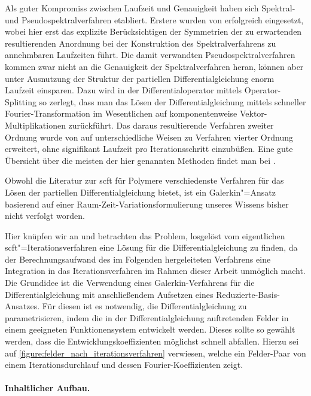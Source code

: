 \documentclass[../main.tex]{subfiles}
\begin{document}
Als guter Kompromiss zwischen Laufzeit und Genauigkeit haben sich Spektral- und Pseudospektralverfahren etabliert.
Erstere wurden von \textcite{Matsen:1994bz} erfolgreich eingesetzt, wobei hier erst das explizite Berücksichtigen der Symmetrien der zu erwartenden resultierenden Anordnung bei der Konstruktion des Spektralverfahrens zu annehmbaren Laufzeiten führt.
Die damit verwandten Pseudospektralverfahren kommen zwar nicht an die Genauigkeit der Spektralverfahren heran, können aber unter Ausnutzung der Struktur der partiellen Differentialgleichung enorm Laufzeit einsparen.
Dazu wird in \cite{Rasmussen:2002kt} der Differentialoperator mittels Operator-Splitting so zerlegt, dass man das Lösen der Differentialgleichung mittels schneller Fourier-Transformation im Wesentlichen auf komponentenweise Vektor-Multiplikationen zurückführt.
Das daraus resultierende Verfahren zweiter Ordnung wurde von \cite{GarciaCervera:2006uu,Ranjan:2007kl} auf unterschiedliche Weisen zu Verfahren vierter Ordnung erweitert, ohne signifikant Laufzeit pro Iterationsschritt einzubüßen.
Eine gute Übersicht über die meisten der hier genannten Methoden findet man bei \textcites[Section 3.6]{Fredrickson:2006th}{Audus:2013ep}.

Obwohl die Literatur zur \ac{scft} für Polymere verschiedenste Verfahren für das Lösen der partiellen Differentialgleichung bietet, ist ein Galerkin"=Ansatz basierend auf einer Raum-Zeit-Variationsformulierung unseres Wissens bisher nicht verfolgt worden.

Hier knüpfen wir an und betrachten das Problem, losgelöst vom eigentlichen \ac{scft}"=Iterationsverfahren eine Lösung für die Differentialgleichung zu finden, da der Berechnungsaufwand des im Folgenden hergeleiteten Verfahrens eine Integration in das Iterationsverfahren im Rahmen dieser Arbeit unmöglich macht.
Die Grundidee ist die Verwendung eines Galerkin-Verfahrens für die Differentialgleichung mit anschließendem Aufsetzen eines Reduzierte-Basis-Ansatzes.
Für diesen ist es notwendig, die Differentialgleichung zu parametrisieren, indem die in der Differentialgleichung auftretenden Felder in einem geeigneten Funktionensystem entwickelt werden.
Dieses sollte so gewählt werden, dass die Entwicklungskoeffizienten möglichst schnell abfallen.
Hierzu sei auf \cref{figure:felder_nach_iterationsverfahren} verwiesen, welche ein Felder-Paar von einem Iterationsdurchlauf und dessen Fourier-Koeffizienten zeigt.


\paragraph{Inhaltlicher Aufbau.}
\end{document}
